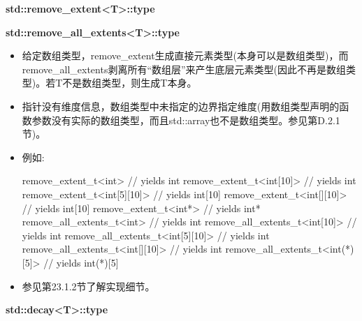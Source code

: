 \textbf{std::remove\_extent<T>::type}

\textbf{std::remove\_all\_extents<T>::type}

\begin{itemize}
\item
给定数组类型，remove\_extent生成直接元素类型(本身可以是数组类型)，而remove\_all\_extents剥离所有“数组层”来产生底层元素类型(因此不再是数组类型)。若T不是数组类型，则生成T本身。

\item
指针没有维度信息，数组类型中未指定的边界指定维度(用数组类型声明的函数参数没有实际的数组类型，而且std::array也不是数组类型。参见第D.2.1节)。

\item
例如:
\begin{cpp}
remove_extent_t<int> // yields int
remove_extent_t<int[10]> // yields int
remove_extent_t<int[5][10]> // yields int[10]
remove_extent_t<int[][10]> // yields int[10]
remove_extent_t<int*> // yields int*
remove_all_extents_t<int> // yields int
remove_all_extents_t<int[10]> // yields int
remove_all_extents_t<int[5][10]> // yields int
remove_all_extents_t<int[][10]> // yields int
remove_all_extents_t<int(*)[5]> // yields int(*)[5]
\end{cpp}

\item
参见第23.1.2节了解实现细节。
\end{itemize}

\textbf{std::decay<T>::type}

